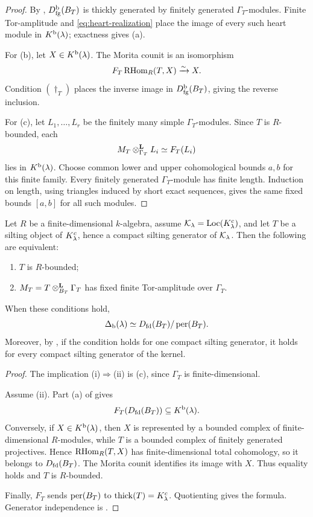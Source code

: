 \begin{proof}
By , \(D^{\mathrm b}_{\mathrm{fg}}(B_T)\) is thickly generated by finitely generated \(\Gamma_T\)-modules.  Finite Tor-amplitude and \eqref{eq:heart-realization} place the image of every such heart module in \(K^{\mathrm b}(\lambda)\); exactness gives (a).

For (b), let \(X\in K^{\mathrm b}(\lambda)\).  The Morita counit is an isomorphism
\[
 F_T\operatorname{RHom}_R(T,X)\xrightarrow{\sim}X.
\]
Condition \((\dagger_T)\) places the inverse image in \(D^{\mathrm b}_{\mathrm{fg}}(B_T)\), giving the reverse inclusion.

For (c), let \(L_1,\ldots,L_r\) be the finitely many simple \(\Gamma_T\)-modules.  Since \(T\) is \(R\)-bounded, each
\[
 M_T\otimes^{\mathbf L}_{\Gamma_T}L_i\simeq F_T(L_i)
\]
lies in \(K^{\mathrm b}(\lambda)\).  Choose common lower and upper cohomological bounds \(a,b\) for this finite family.  Every finitely generated \(\Gamma_T\)-module has finite length.  Induction on length, using triangles induced by short exact sequences, gives the same fixed bounds \([a,b]\) for all such modules.
\end{proof}

\begin{theorem}\label{thm:heart-amplitude}
Let \(R\) be a finite-dimensional \(k\)-algebra, assume \(\mathcal K_\lambda=\operatorname{Loc}(K^c_\lambda)\), and let \(T\) be a silting object of \(K^c_\lambda\), hence a compact silting generator of \(\mathcal K_\lambda\).  Then the following are equivalent:
\begin{enumerate}[label=(\roman*)]
\item \(T\) is \(R\)-bounded;
\item \(M_T=T\otimes^{\mathbf L}_{B_T}\Gamma_T\) has fixed finite Tor-amplitude over \(\Gamma_T\).
\end{enumerate}
When these conditions hold,
\[
 \Delta_{\mathrm b}(\lambda)
 \simeq
 D_{\mathrm{fd}}(B_T)/\operatorname{per}(B_T).
\]
Moreover, by , if the condition holds for one compact silting generator, it holds for every compact silting generator of the kernel.
\end{theorem}

\begin{proof}
The implication (i)\(\Rightarrow\)(ii) is
(c), since \(\Gamma_T\) is finite-dimensional.

Assume (ii).  Part (a) of  gives
\[
 F_T(D_{\mathrm{fd}}(B_T))\subseteq K^{\mathrm b}(\lambda).
\]
Conversely, if \(X\in K^{\mathrm b}(\lambda)\), then \(X\) is represented by a bounded complex of finite-dimensional \(R\)-modules, while \(T\) is a bounded complex of finitely generated projectives.  Hence
\(\operatorname{RHom}_R(T,X)\) has finite-dimensional total cohomology, so it belongs to \(D_{\mathrm{fd}}(B_T)\).  The Morita counit identifies its image with \(X\).  Thus equality holds and \(T\) is \(R\)-bounded.

Finally, \(F_T\) sends \(\operatorname{per}(B_T)\) to
\(\operatorname{thick}(T)=K^c_\lambda\).  Quotienting gives the formula.  Generator independence is .
\end{proof}

